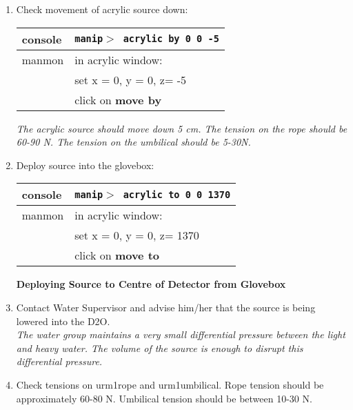\begin{enumerate}
 \item\checkbox Check movement of acrylic source down:
  \begin{center}
  \begin{tabular}{|l|l|}
  \hline
  console & {\tt manip$>$ acrylic by 0 0 -5} \\
  \hline
  manmon  & in acrylic window: \\
          & set x = 0, y = 0, z= -5\\
          & click on {\bf move by} \\
  \hline
  \end{tabular}
  \end{center}
  \small
  {\em 
    The acrylic source should move down 5 cm.  The tension on the rope
    should be 60-90 N.  The tension on the umbilical should be
    5-30N.
  }
  \normalsize

 \item\checkbox Deploy source into the glovebox:
  \begin{center}
  \begin{tabular}{|l|l|}
  \hline
  console & {\tt manip$>$ acrylic to 0 0 1370} \\
  \hline
  manmon  & in acrylic window: \\
          & set x = 0, y = 0, z= 1370\\
          & click on {\bf move to} \\
  \hline
  \end{tabular}
  \end{center}



\begin{center}
  {\bf Deploying Source to Centre of 
            Detector from Glovebox}
\end{center}
 
 \item\checkbox Contact Water Supervisor and advise him/her that the source is
   being lowered into the D2O.  \\
   \small
   {\em
     The water group maintains a very small differential pressure
     between the light and heavy water.  The volume of the source
     is enough to disrupt this differential pressure.
   }
   \normalsize

 \item\checkbox Check tensions on urm1rope and urm1umbilical.  Rope tension
   should be approximately 60-80 N.  Umbilical tension should
   be between 10-30 N.


\end{enumerate}
